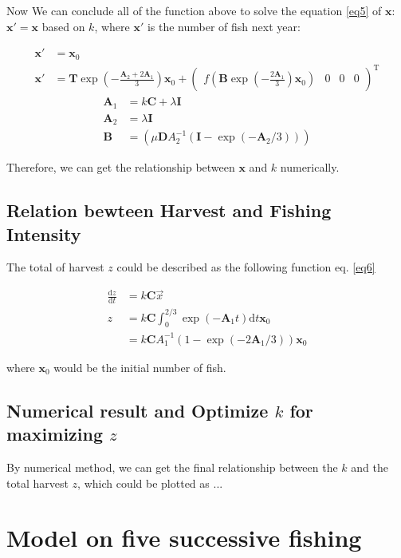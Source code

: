\documentclass{IEEEtran}
\begin{document}
Now We can conclude all of the function above to solve the equation \ref{eq5} of $\bm x$: $\bm x' = \bm x$ based on $k$, where $\bm x'$ is the number of fish next year:  

\begin{align}
    \bm x' &= \bm x_0\\
    \label{eq5}
    \bm x' &= \mathbf T \exp(-\frac{\mathbf A_2 + 2 \mathbf A_1}{3})\bm x_0 +\begin{pmatrix} f(\mathbf B \exp(-\frac{2\mathbf A_1}{3})\bm x_0)&0&0&0\end{pmatrix}^{\mathrm T}
\end{align}
\begin{align}
    \mathbf A_1 &= k\mathbf C + \lambda \mathbf I\\
    \mathbf A_2 &= \lambda \mathbf I\\
    \mathbf B &= (\mu \mathbf D A_2^{-1}(\mathbf I - \exp(-\mathbf A_2/3)))
\end{align}

Therefore, we can get the relationship between $\bm x$ and $k$ numerically.
\subsection{Relation bewteen Harvest and Fishing Intensity}
The total of harvest $z$ could be described as the following function eq. \ref{eq6}

\begin{align}
    \label{eq6}
    \frac {\mathrm dz}{\mathrm dt} &= k\mathbf C \vec x\\
    z &= k\mathbf C\int_0^{2/3}\exp(-\mathbf A_1t)\mathrm dt\bm x_0 \\ 
    &= k\mathbf C  A_1^{-1} (1-\exp(-2\mathbf A_1/3))\bm x_0
\end{align}

where $\bm x_0$ would be the initial number of fish.

\subsection{Numerical result and Optimize $k$ for maximizing $z$}

By numerical method, we can get the final relationship between the $k$ and the total harvest $z$, which could be plotted as ...

%
%
\section{Model on five successive fishing}
\end{document}

